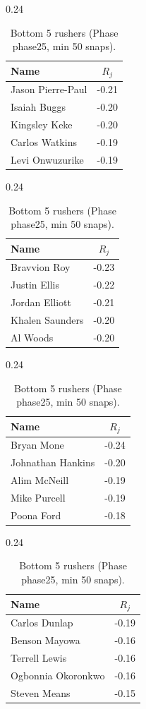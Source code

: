 \begin{table}[h!]
\centering
\begin{subtable}{0.24\textwidth}
\centering
\footnotesize
\begin{tabular}{lc}
\toprule
Name & $R_j$ \\
\midrule
Jason Pierre-Paul & -0.21 \\
Isaiah Buggs & -0.20 \\
Kingsley Keke & -0.20 \\
Carlos Watkins & -0.19 \\
Levi Onwuzurike & -0.19 \\
\bottomrule
\end{tabular}
\caption{DE}
\end{subtable}
\hfill
\begin{subtable}{0.24\textwidth}
\centering
\footnotesize
\begin{tabular}{lc}
\toprule
Name & $R_j$ \\
\midrule
Bravvion Roy & -0.23 \\
Justin Ellis & -0.22 \\
Jordan Elliott & -0.21 \\
Khalen Saunders & -0.20 \\
Al Woods & -0.20 \\
\bottomrule
\end{tabular}
\caption{DT}
\end{subtable}
\hfill
\begin{subtable}{0.24\textwidth}
\centering
\footnotesize
\begin{tabular}{lc}
\toprule
Name & $R_j$ \\
\midrule
Bryan Mone & -0.24 \\
Johnathan Hankins & -0.20 \\
Alim McNeill & -0.19 \\
Mike Purcell & -0.19 \\
Poona Ford & -0.18 \\
\bottomrule
\end{tabular}
\caption{NT}
\end{subtable}
\hfill
\begin{subtable}{0.24\textwidth}
\centering
\footnotesize
\begin{tabular}{lc}
\toprule
Name & $R_j$ \\
\midrule
Carlos Dunlap & -0.19 \\
Benson Mayowa & -0.16 \\
Terrell Lewis & -0.16 \\
Ogbonnia Okoronkwo & -0.16 \\
Steven Means & -0.15 \\
\bottomrule
\end{tabular}
\caption{OLB}
\end{subtable}
\caption{Bottom 5 rushers (Phase phase25, min 50 snaps).}
\label{tab:rusher_pm_phase25_bot}
\end{table}
